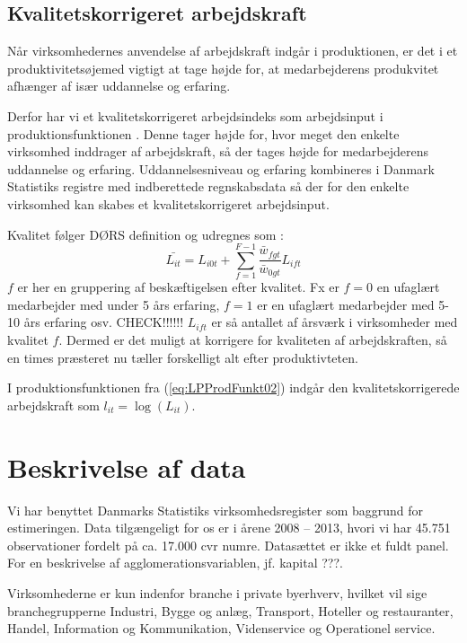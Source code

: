 \subsection{Kvalitetskorrigeret arbejdskraft}
Når virksomhedernes anvendelse af arbejdskraft indgår i produktionen, er det i et produktivitetsøjemed vigtigt at tage højde for, at medarbejderens produkvitet afhænger af især uddannelse og erfaring.

Derfor har vi et kvalitetskorrigeret arbejdsindeks som arbejdsinput i produktionsfunktionen \cite[s. 5]{dors2010baggrund}. Denne tager højde for, hvor meget den enkelte virksomhed inddrager af arbejdskraft, så der tages højde for medarbejderens uddannelse og erfaring. Uddannelsesniveau og erfaring kombineres i Danmark Statistiks registre med indberettede regnskabsdata så der for den enkelte virksomhed kan skabes et kvalitetskorrigeret arbejdsinput.

Kvalitet følger DØRS definition og udregnes som \cite[s. 5]{dors2010baggrund}:
\begin{equation}
	\bar{L_{it}} = 
	L_{i0t} + \sum_{f=1}^{F-1} \frac{\bar{w}_{fgt}}{\bar{w}_{0gt}} 
	L_{ift}
\end{equation}
$f$ er her en gruppering af beskæftigelsen efter kvalitet. Fx er $f=0$ en ufaglært medarbejder med under 5 års erfaring, $f=1$ er en ufaglært medarbejder med 5-10 års erfaring osv. CHECK!!!!!!
$L_{ift}$ er så antallet af årsværk i virksomheder med kvalitet $f$. Dermed er det muligt at korrigere for kvaliteten af arbejdskraften, så en times præsteret nu tæller forskelligt alt efter produktivteten.

I produktionsfunktionen fra (\ref{eq:LPProdFunkt02}) indgår den kvalitetskorrigerede arbejdskraft som $l_{it} = \log(L_{it})$.  

\section{Beskrivelse af data}
Vi har benyttet Danmarks Statistiks virksomhedsregister som baggrund for estimeringen. Data tilgængeligt for os er i årene 2008 -- 2013, hvori vi har 45.751 observationer fordelt på ca. 17.000 cvr numre. Datasættet er ikke et fuldt panel. For en beskrivelse af agglomerationsvariablen, jf. kapital ???.

Virksomhederne er kun indenfor branche i private byerhverv, hvilket vil sige branchegrupperne Industri, Bygge og anlæg, Transport, Hoteller og restauranter, Handel, Information og Kommunikation, Videnservice og Operationel service.

